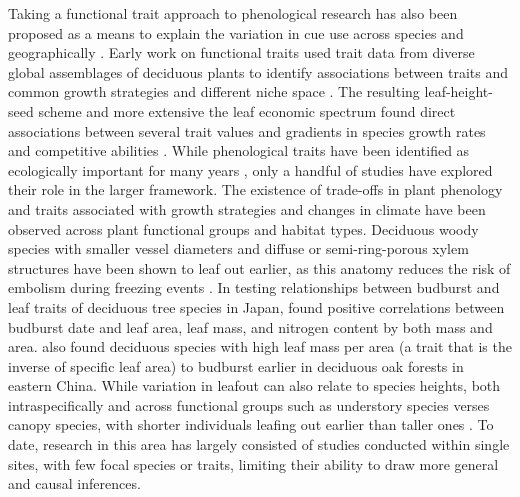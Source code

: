 \documentclass{article}\usepackage[]{graphicx}\usepackage[]{color}
\begin{document}
Taking a functional trait approach to phenological research has also been proposed as a means to explain the variation in cue use across species and geographically \citep{Flynn2018,Osada2017}. Early work on functional traits used trait data from diverse global assemblages of deciduous plants to identify associations between traits and common growth strategies and different niche space \citep{Westoby1998,Wright2004,Chave2009}. The resulting leaf-height-seed scheme and more extensive the leaf economic spectrum found direct associations between several trait values and gradients in species growth rates and competitive abilities \citep{Westoby1998,Wright2004,Diaz2016,Chave2009,Funk2016}. While phenological traits have been identified as ecologically important for many years \citep{Weiher1999, Laughlin2014 %
}, only a handful of studies have explored their role in the larger framework. The existence of trade-offs in plant phenology and traits associated with growth strategies and changes in climate have been observed across plant functional groups and habitat types. Deciduous woody species with smaller vessel diameters and diffuse or semi-ring-porous xylem structures have been shown to leaf out earlier, as this anatomy reduces the risk of embolism during freezing events  \citep{Panchen2014, Lechowicz1984}. In testing relationships between budburst and leaf traits of deciduous tree species in Japan, \citep{Osada2017} found positive correlations between budburst date and leaf area, leaf mass, and nitrogen content by both mass and area. \citep{Sun2006} also found deciduous species with high leaf mass per area (a trait that is the inverse of specific leaf area) to budburst earlier in deciduous oak forests in eastern China. %
While variation in leafout can also relate to species heights, both intraspecifically and across functional groups such as understory species verses canopy species, with shorter individuals leafing out earlier than taller ones \citep{Seiwa1998, 1999b}. To date, research in this area has largely consisted of studies conducted within single sites, with few focal species or traits, limiting their ability to draw more general and causal inferences. 

\end{document}
